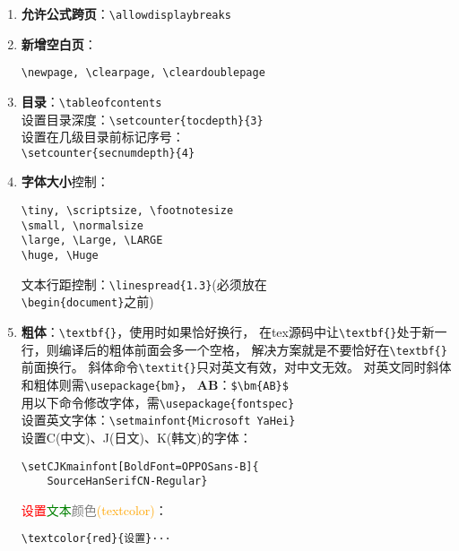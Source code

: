 \documentclass{article}
\renewcommand{\today}{\number\year-\number\month-\number\day}
\begin{document}
\begin{multicols}{2}
\begin{enumerate}
\begin{lstlisting}
\footnotetext{\scriptsize#1}
\renewcommand{\thefootnote}{
\ding{\numexpr171+\value{footnote}}}}    
\end{lstlisting} 


\item \textbf{允许公式跨页}：\verb|\allowdisplaybreaks|

\item \textbf{新增空白页}：
\begin{lstlisting}
\newpage, \clearpage, \cleardoublepage
\end{lstlisting} 


\item \textbf{目录}：\verb|\tableofcontents| \\
设置目录深度：\verb|\setcounter{tocdepth}{3}| \\
设置在几级目录前标记序号：\\ 
\verb|\setcounter{secnumdepth}{4}|

\item \textbf{字体大小}控制：
\begin{lstlisting}
\tiny, \scriptsize, \footnotesize
\small, \normalsize
\large, \Large, \LARGE
\huge, \Huge    
\end{lstlisting} 

文本行距控制：\verb|\linespread{1.3}|(必须放在\\
    \verb|\begin{document}|之前) 

\item \textbf{粗体}：\verb|\textbf{}|，使用时如果恰好换行，
在tex源码中让\verb|\textbf{}|处于新一行，则编译后的粗体前面会多一个空格，
解决方案就是不要恰好在\verb|\textbf{}|前面换行。
斜体命令\verb|\textit{}|只对英文有效，对中文无效。
对英文同时斜体和粗体则需\verb|\usepackage{bm}|，
$ \bm{AB} $：\verb|$\bm{AB}$| \\
用以下命令修改字体，需\verb|\usepackage{fontspec}|\\
设置英文字体：\verb|\setmainfont{Microsoft YaHei}|\\
设置C(中文)、J(日文)、K(韩文)的字体：
\begin{lstlisting}
\setCJKmainfont[BoldFont=OPPOSans-B]{
    SourceHanSerifCN-Regular}
\end{lstlisting} 
\textcolor{red}{设置}\textcolor{green}{文本}\textcolor{gray}{颜色}\textcolor{orange}{(textcolor)}：
\begin{lstlisting}
\textcolor{red}{设置}···
\end{lstlisting} 



\end{enumerate}
\end{multicols}
\end{document}

